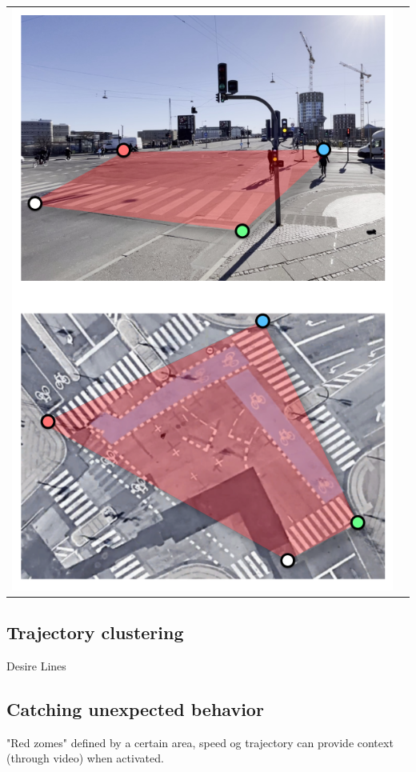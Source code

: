 \documentclass[
10pt, %
a4paper, %
oneside, %
headinclude,footinclude, %
] {book}%
\begin{document}
\raggedbottom
\ \\ 
\noindent
\begin{tabular}{@{}cc}
\includegraphics[width=1.0\columnwidth]{projection_figure} 
\end{tabular}
\label{projection_figure}

\subsection{Trajectory clustering}
Desire Lines

\subsection{Catching unexpected behavior}
"Red zomes" defined by a certain area, speed og trajectory can provide context (through video) when activated. 
\end{document}
